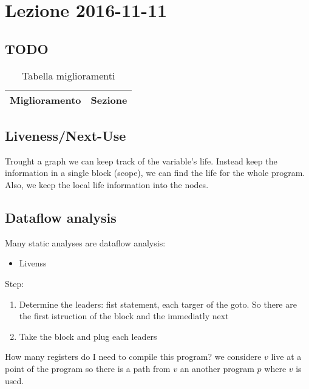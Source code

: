 \section{Lezione 2016-11-11}
\subsection{TODO}
\begin{table}[H]
\begin{center}
\begin{tabular}{|p{\textwidth}|c|}
\hline
\multicolumn{1}{|c|}{\textbf{Miglioramento}} & \textbf{Sezione} \\ \hline
\end{tabular}
\end{center}
\caption{Tabella miglioramenti}
\label{tab:tab_todo}
\end{table}

\subsection{Liveness/Next-Use}
Trought a graph we can keep track of the variable's life. Instead keep the
information in a single block (scope), we can find the life for the whole
program. Also, we keep the local life information into the nodes.

\subsection{Dataflow analysis}
Many static analyses are dataflow analysis:
\begin{itemize}
\item Livenss
\end{itemize}

Step:
\begin{enumerate}
\item Determine the leaders: fist statement, each targer of the goto. So there
are the first istruction of the block and the immediatly next
\item Take the block and plug each leaders
\end{enumerate}

How many registers do I need to compile this program?
we considere $v$ live at a point of the program so there is a path from $v$
an another program $p$ where $v$ is used.

